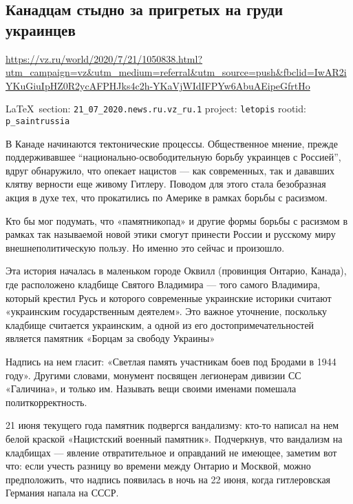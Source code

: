  
 
\subsection{Канадцам стыдно за пригретых на груди украинцев}
\label{sec:21_07_2020.news.ru.vz_ru.1}
\url{https://vz.ru/world/2020/7/21/1050838.html?utm_campaign=vz&utm_medium=referral&utm_source=push&fbclid=IwAR2iYKuGiuIpHZ0R2ycAFPHJks4c2h-YKaVjWIdIFPYw6AbuAEipeGfrtHo}
  
\vspace{0.5cm}
{\small\LaTeX~section: \verb|21_07_2020.news.ru.vz_ru.1| project: \verb|letopis| rootid: \verb|p_saintrussia|}
\vspace{0.5cm}

В Канаде начинаются тектонические процессы. Общественное мнение, прежде
поддерживавшее ``национально-освободительную борьбу украинцев с Россией'', вдруг
обнаружило, что опекает нацистов --- как современных, так и дававших клятву
верности еще живому Гитлеру. Поводом для этого стала безобразная акция в духе
тех, что прокатились по Америке в рамках борьбы с расизмом.

Кто бы мог подумать, что «памятникопад» и другие формы борьбы с расизмом в
рамках так называемой новой этики смогут принести России и русскому миру
внешнеполитическую пользу. Но именно это сейчас и произошло.

Эта история началась в маленьком городе Оквилл (провинция Онтарио, Канада), где
расположено кладбище Святого Владимира --- того самого Владимира, который крестил
Русь и которого современные украинские историки считают «украинским
государственным деятелем». Это важное уточнение, поскольку кладбище считается
украинским, а одной из его достопримечательностей является памятник «Борцам за
свободу Украины»

Надпись на нем гласит: «Светлая память участникам боев под Бродами в 1944
году». Другими словами, монумент посвящен легионерам дивизии СС «Галичина», и
только им. Называть вещи своими именами помешала политкорректность.

21 июня текущего года памятник подвергся вандализму: кто-то написал на нем
белой краской «Нацистский военный памятник». Подчеркнув, что вандализм на
кладбищах --- явление отвратительное и оправданий не имеющее, заметим вот что:
если учесть разницу во времени между Онтарио и Москвой, можно предположить, что
надпись появилась в ночь на 22 июня, когда гитлеровская Германия напала на
СССР.

